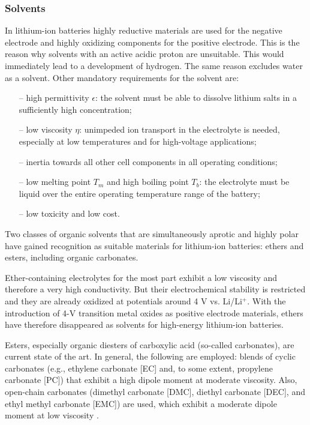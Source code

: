 \subsubsection{Solvents}
\label{sec:solvents}
In lithium-ion batteries highly reductive materials are used for the negative electrode and highly oxidizing components for the positive electrode. This is the reason why solvents with an active acidic proton are unsuitable. This would immediately lead to a development of hydrogen. The same reason excludes water as a solvent. Other mandatory requirements for the solvent are:
\begin{itemize}
    \item[--] high permittivity $\epsilon$: the solvent must be able to dissolve lithium salts in a sufficiently high concentration;
    \item[--] low viscosity $\eta$: unimpeded ion transport in the electrolyte is needed, especially at low temperatures and for high-voltage applications;
    \item[--] inertia towards all other cell components in all operating conditions;
    \item[--] low melting point $T_m$ and high boiling point $T_b$: the electrolyte must be liquid over the entire operating temperature range of the battery;
    \item[--] low toxicity and low cost.
\end{itemize}

Two classes of organic solvents that are simultaneously aprotic and highly polar have gained recognition as suitable materials for lithium-ion batteries: ethers and esters, including organic carbonates.

Ether-containing electrolytes for the most part exhibit a low viscosity and therefore a very high conductivity. But their electrochemical stability is restricted and they are already oxidized at potentials around 4 V vs. Li/Li$^+$. With the introduction of 4-V transition metal oxides as positive electrode materials, ethers have therefore disappeared as solvents for high-energy lithium-ion batteries.

Esters, especially organic diesters of carboxylic acid (so-called carbonates), are current state of the art. In general, the following are employed: blends of cyclic carbonates (e.g., ethylene carbonate [EC] and, to some extent, propylene carbonate [PC]) that exhibit a high dipole moment at moderate viscosity. Also, open-chain carbonates (dimethyl carbonate [DMC], diethyl carbonate [DEC], and ethyl methyl carbonate [EMC]) are used, which exhibit a moderate dipole moment at low viscosity \cite{xu2004nonaqueous,aurbach1995study,song1999review}.

